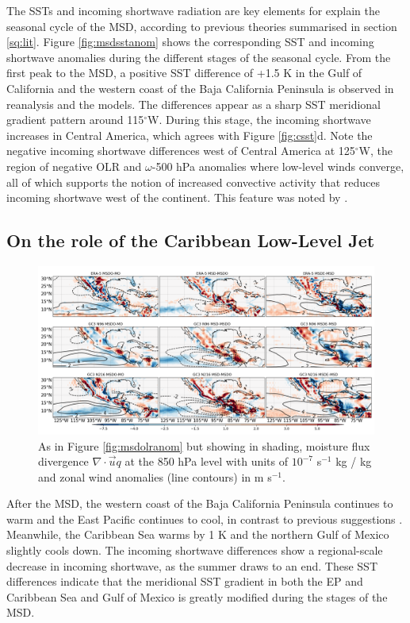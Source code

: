 The SSTs and incoming shortwave radiation are key elements for explain the seasonal cycle of the MSD, according to previous theories summarised in section \ref{sq:lit}. 
Figure \ref{fig:msdsstanom} shows the corresponding SST and incoming shortwave anomalies during the different stages of the seasonal cycle. %
From the first peak to the MSD, a positive SST difference of +1.5 K in the Gulf of California and the western coast of the Baja California Peninsula is observed in reanalysis and the models. The differences appear as a sharp SST meridional gradient pattern around 115$^\circ$W. 
During this stage, the incoming shortwave increases in Central America, which agrees with Figure \ref{fig:csst}d. 
Note the negative incoming shortwave differences west of Central America at 125$^\circ$W, the region of negative OLR and $\omega$-500 hPa anomalies where low-level winds converge, all of which supports the notion of increased convective activity that reduces incoming shortwave west of the continent. This feature was noted by \cite{herrera2015}. 

\subsection{On the role of the Caribbean Low-Level Jet}

 \begin{figure}[t!]
\includegraphics[width=\linewidth]{figures/modcompar_dif2mfc3}
\caption{As in Figure \ref{fig:msdolranom} but showing in shading, moisture flux divergence $\nabla \cdot \vec{u}q$ at the 850 hPa level with units of $10^{-7}$ s$^{-1}$ kg / kg and zonal wind anomalies (line contours) in m s$^{-1}$.  }
\label{fig:msdmfcanom}
\end{figure}

After the MSD, the western coast of the Baja California Peninsula continues to warm and the East Pacific continues to cool, in contrast to previous suggestions \citep{magana1999,magana2005,herrera2015}. Meanwhile, the Caribbean Sea warms by 1 K and the northern Gulf of Mexico slightly cools down. The incoming shortwave differences show a regional-scale decrease in incoming shortwave, as the summer draws to an end. 
These SST differences indicate that the meridional SST gradient in both the EP and Caribbean Sea and Gulf of Mexico is greatly modified during the stages of the MSD. 


